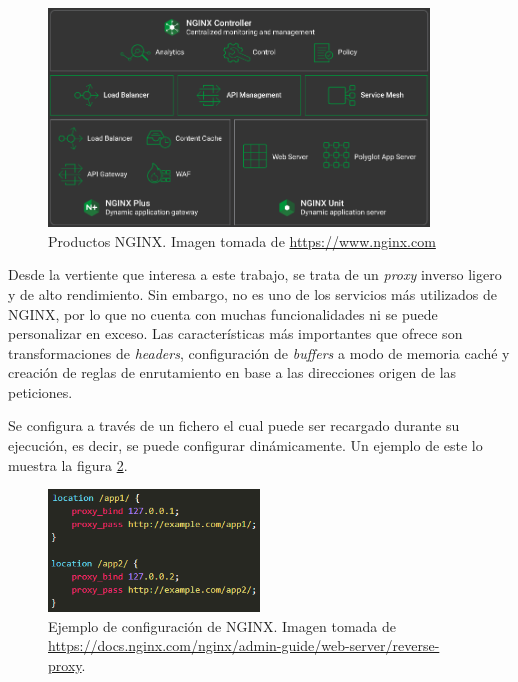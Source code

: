 \documentclass[11pt,spanish,listoffigures]{tfgetsinf}
\begin{document}
\begin{figure}[ht]
\centering
\includegraphics[width=0.9\textwidth]{imagenes/productosNGINX}
\caption[Productos NGINX]{Productos NGINX. Imagen tomada de \url{https://www.nginx.com}}
	\label{productosNGINX}
\end{figure}

Desde la vertiente que interesa a este trabajo, se trata de un \emph{proxy} inverso ligero y de alto rendimiento. Sin embargo, no es uno de los servicios más utilizados de NGINX, por lo que no cuenta con muchas funcionalidades ni se puede personalizar en exceso. Las características más importantes que ofrece son transformaciones de \emph{headers}, configuración de \emph{buffers} a modo de memoria caché y creación de reglas de enrutamiento en base a las direcciones origen de las peticiones.

Se configura a través de un fichero el cual puede ser recargado durante su ejecución, es decir, se puede configurar dinámicamente. Un ejemplo de este lo muestra la figura \ref{configuracionNGINX}.

\begin{figure}[ht]
\centering
\includegraphics[width=0.5\textwidth]{imagenes/configuracionNGINX}
\caption[Ejemplo de configuración de NGINX.]{Ejemplo de configuración de NGINX. Imagen tomada de \url{https://docs.nginx.com/nginx/admin-guide/web-server/reverse-proxy}.}
	\label{configuracionNGINX}
\end{figure}
\end{document}
